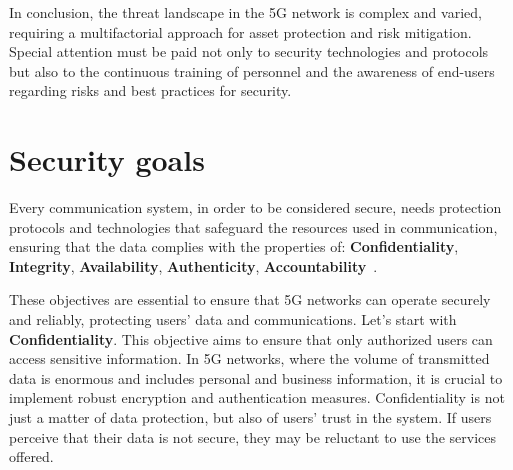 \documentclass[english]{article}
\begin{document}
In conclusion, the threat landscape in the 5G network is complex and varied,
requiring a multifactorial approach for asset protection and risk mitigation.
Special attention must be paid not only to security technologies and protocols
but also to the continuous training of personnel and the awareness of end-users
regarding risks and best practices for security.

\section{Security goals}\label{sec:SecurityGoal}
Every communication system, in order to be considered secure, needs protection
protocols and technologies that safeguard the resources used in communication,
ensuring that the data complies with the properties of:
\textbf{Confidentiality}, \textbf{Integrity}, \textbf{Availability},
\textbf{Authenticity}, \textbf{Accountability}~\cite{mohan2022cyber}.

These objectives are essential to ensure that 5G networks can operate securely
and reliably, protecting users' data and communications. Let’s start with
\textbf{Confidentiality}. This objective aims to ensure that only authorized
users can access sensitive information. In 5G networks, where the volume of
transmitted data is enormous and includes personal and business information, it
is crucial to implement robust encryption and authentication measures.
Confidentiality is not just a matter of data protection, but also of users'
trust in the system. If users perceive that their data is not secure, they may
be reluctant to use the services offered.
\end{document}

